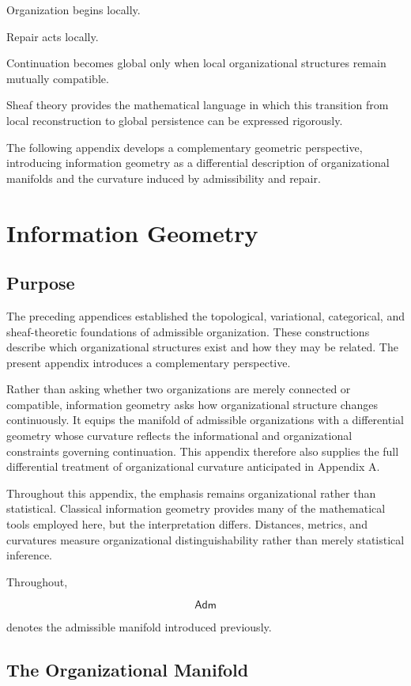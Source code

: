 \documentclass[11pt,oneside]{book}
\numberwithin{equation}{chapter}
\theoremstyle{definition}
\theoremstyle{plain}
\newcommand{\Adm}{\mathsf{Adm}}
\begin{document}
Organization begins locally.

Repair acts locally.

Continuation becomes global only when local organizational structures
remain mutually compatible.

Sheaf theory provides the mathematical language in which this transition
from local reconstruction to global persistence can be expressed
rigorously.

The following appendix develops a complementary geometric perspective,
introducing information geometry as a differential description of
organizational manifolds and the curvature induced by admissibility and
repair.

\chapter{Information Geometry}

\section{Purpose}

The preceding appendices established the topological, variational,
categorical, and sheaf-theoretic foundations of admissible organization.
These constructions describe which organizational structures exist and
how they may be related. The present appendix introduces a complementary
perspective.

Rather than asking whether two organizations are merely connected or
compatible, information geometry asks how organizational structure
changes continuously. It equips the manifold of admissible organizations
with a differential geometry whose curvature reflects the informational
and organizational constraints governing continuation. This appendix
therefore also supplies the full differential treatment of organizational
curvature anticipated in Appendix A.

Throughout this appendix, the emphasis remains organizational rather than
statistical. Classical information geometry provides many of the
mathematical tools employed here, but the interpretation differs.
Distances, metrics, and curvatures measure organizational
distinguishability rather than merely statistical inference.

Throughout,

\[
\Adm
\]

denotes the admissible manifold introduced previously.

\section{The Organizational Manifold}
\end{document}
